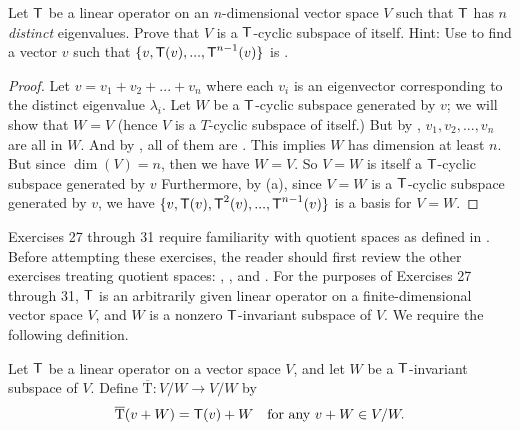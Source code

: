 \begin{exercise} \label{exercise 5.4.26}
Let \(\textsf{T}\) be a linear operator on an \(n\)-dimensional vector space \(V\) such that \(\textsf{T}\) has \(n\) \emph{distinct} eigenvalues.
Prove that \(V\) is a \(\textsf{T}\)-cyclic subspace of itself.
Hint: Use  to find a vector \(v\) such that \(\{ v, \textsf{T}(v), ..., \textsf{T}^{n-1}(v) \}\) is \LID{}.
\end{exercise}

\begin{proof}
Let \(v = v_1 + v_2 + ... + v_n\) where each \(v_i\) is an eigenvector corresponding to the distinct eigenvalue \(\lambda_i\).
Let \(W\) be a \(\textsf{T}\)-cyclic subspace generated by \(v\); we will show that \(W = V\) (hence \(V\) is a \(T\)-cyclic subspace of itself.)
But by , \(v_1, v_2, ..., v_n\) are all in \(W\).
And by , all of them are \LID{}.
This implies \(W\) has dimension at least \(n\).
But since \(\dim(V) = n\), then we have \(W = V\).
So \(V = W\) is itself a \(\textsf{T}\)-cyclic subspace generated by \(v\)
Furthermore, by (a), since \(V = W\) is a \(\textsf{T}\)-cyclic subspace generated by \(v\), we have \(\{ v, \textsf{T}(v), \textsf{T}^2(v), ..., \textsf{T}^{n - 1}(v) \}\) is a basis for \(V = W\).
\end{proof}

Exercises 27 through 31 require familiarity with quotient spaces as defined in .
Before attempting these exercises, the reader should first review the other exercises treating quotient spaces:
, , and .
For the purposes of Exercises 27 through 31, \(\textsf{T}\) is an arbitrarily given linear operator on a finite-dimensional vector space \(V\), and \(W\) is a nonzero \(\textsf{T}\)-invariant subspace of \(V\).
We require the following definition.

\newcommand{\Tover}{\mathrm{\overline{T}}}

\setcounter{additional definition}{3} %
\begin{additional definition} \label{adef 5.4}
Let \(\textsf{T}\) be a linear operator on a vector space \(V\), and let \(W\) be a \(\textsf{T}\)-invariant subspace of \(V\).
Define \(\Tover: V/W \to V/W\) by
\[
    \Tover(v + W) = \T(v) + W \quad \text{for any } v + W \in V/W. 
\]
\end{additional definition}

